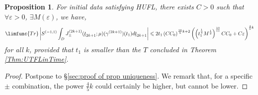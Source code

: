 \documentclass[12pt,letterpaper,leqno]{amsart}
\theoremstyle{plain}
\newtheorem{proposition}{Proposition}
\numberwithin{equation}{section}
\numberwithin{theorem}{section}
\numberwithin{proposition}{section}
\numberwithin{lemma}{section}
\numberwithin{corollary}{section}
\begin{document}
\begin{proposition}
\label{Prop:estimate for a typical term in uniqueness}For initial data
satisfying HUFL, there exists $C>0$ such that $\forall \varepsilon >0$, $%
\exists M(\varepsilon )$, we have, 
\begin{equation*}
\limfunc{Tr}\left\vert S^{(-1,1)}\int_{D}J_{\pm }^{(2k+1)}(\underline{t}%
_{2k+1};\mu )(\gamma ^{(2k+1)})(t_{1})d\underline{t}_{2k+1}\right\vert
\leqslant 2t_{1}\left( CC_{0}\right) ^{\frac{16}{5}k+2}\left( \left( t_{1}^{%
\frac{1}{4}}M^{\frac{1}{2}}\right) ^{\frac{10}{11}}CC_{0}+C\varepsilon
\right) ^{\frac{4}{5}k}
\end{equation*}%
for all $k$, provided that $t_{1}$ is smaller than the $T$ concluded in
Theorem \ref{Thm:UTFLinTime}.
\end{proposition}

\begin{proof}
Postpone to \S \ref{sec:proof of prop uniqueness}. We remark that, for a
specific $\pm $ combination, the power $\frac{4}{5}k$ could certainly be
higher, but cannot be lower.
\end{proof}
\end{document}
